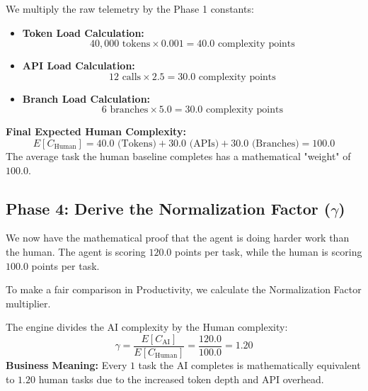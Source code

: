 \documentclass[11pt,a4paper]{article}
\begin{document}
\begin{tcolorbox}[enhanced, colback=dpicloud!5!white, colframe=dpiteal, title={\textbf{Phase 3: Step-by-Step Human Arithmetic}}, fonttitle=\bfseries]
We multiply the raw telemetry by the Phase 1 constants:
\vspace{0.2cm}
\begin{itemize}
    \item \textbf{Token Load Calculation:} 
    \[ 40,000 \text{ tokens} \times 0.001 = \mathbf{40.0} \text{ complexity points} \]
    \item \textbf{API Load Calculation:} 
    \[ 12 \text{ calls} \times 2.5 = \mathbf{30.0} \text{ complexity points} \]
    \item \textbf{Branch Load Calculation:} 
    \[ 6 \text{ branches} \times 5.0 = \mathbf{30.0} \text{ complexity points} \]
\end{itemize}

\vspace{0.2cm}
\textbf{Final Expected Human Complexity:}
\[
E[C_{\text{Human}}] = 40.0 \text{ (Tokens)} + 30.0 \text{ (APIs)} + 30.0 \text{ (Branches)} = \mathbf{100.0}
\]
The average task the human baseline completes has a mathematical "weight" of $100.0$.
\end{tcolorbox}

\newpage

\subsection{Phase 4: Derive the Normalization Factor ($\gamma$)}

We now have the mathematical proof that the agent is doing harder work than the human. The agent is scoring $120.0$ points per task, while the human is scoring $100.0$ points per task. 

To make a fair comparison in Productivity, we calculate the Normalization Factor multiplier.

\begin{tcolorbox}[enhanced, colback=orange!5!white, colframe=orange, title={\textbf{Phase 4: The $\gamma$ Ratio Calculation}}, fonttitle=\bfseries]
The engine divides the AI complexity by the Human complexity:
\[
\gamma = \frac{E[C_{\text{AI}}]}{E[C_{\text{Human}}]} = \frac{120.0}{100.0} = \mathbf{1.20}
\]
\textbf{Business Meaning:} Every $1$ task the AI completes is mathematically equivalent to $1.20$ human tasks due to the increased token depth and API overhead.
\end{tcolorbox}
\end{document}
